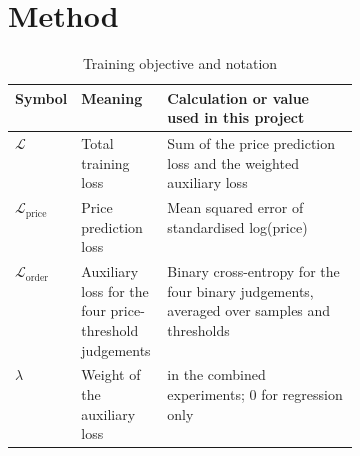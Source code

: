 
\section{Method}


\begin{table}[!htbp]
\centering\footnotesize
\caption{Training objective and notation}
\label{tab:objective}
\begin{tabularx}{\linewidth}{@{}>{\raggedright\arraybackslash}p{0.15\linewidth}>{\raggedright\arraybackslash}p{0.25\linewidth}>{\raggedright\arraybackslash}X@{}}
\toprule
Symbol & Meaning & Calculation or value used in this project \\
\midrule
\(\mathcal{L}\) & Total training loss & Sum of the price prediction loss and the weighted auxiliary loss \\
\(\mathcal{L}_{\mathrm{price}}\) & Price prediction loss & Mean squared error of standardised log(price) \\
\(\mathcal{L}_{\mathrm{order}}\) & Auxiliary loss for the four price-threshold judgements & Binary cross-entropy for the four binary judgements, averaged over samples and thresholds \\
\(\lambda\) & Weight of the auxiliary loss & 0.3 in the combined experiments; 0 for regression only \\
\bottomrule
\end{tabularx}

\end{table}

